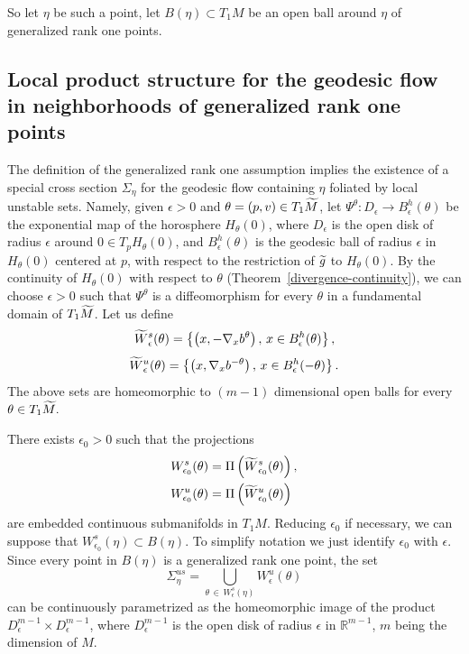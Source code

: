 \documentclass[AHL,Unicode,longabstracts,published]{cedram}
\newcommand{\bbR}{\mathbb{R}}
\let\oldtilde\tilde
\renewcommand*{\tilde}[1]{\mathchoice{\widetilde{#1}}{\widetilde{#1}}{\oldtilde{#1}}{\oldtilde{#1}}}
\begin{document}
So let $\eta$ be such a point, let $B(\eta) \subset T_{1}M$ be an open ball around $\eta$ of generalized rank one points.

\subsection{Local product structure for the geodesic flow in neighborhoods of generalized rank one points}

The definition of the generalized rank one assumption implies the existence of a special cross section $\Sigma_{\eta}$ for the geodesic flow containing $\eta$ foliated by local unstable sets. Namely, given $\epsilon >0$ and $\theta =(p,v) \in T_{1}\tilde{M}$, let $\Psi^{\theta} : D_{\epsilon} \longrightarrow B_{\epsilon}^{h}(\theta)$ be the exponential map of the horosphere $H_{\theta}(0)$, where $D_{\epsilon}$ is the open disk of radius $\epsilon$ around $0 \in T_{p}H_{\theta}(0)$, and $B_{\epsilon}^{h}(\theta)$ is the geodesic ball of radius $\epsilon$ in $H_{\theta}(0)$ centered at $p$, with respect to the restriction of $\tilde{g}$ to $H_{\theta}(0)$. By the continuity of $H_{\theta}(0)$ with respect to $\theta$ (Theorem~\ref{divergence-continuity}), we can choose $\epsilon >0$ such that $\Psi^{\theta}$ is a diffeomorphism for every $\theta$ in a fundamental domain of $T_{1}\tilde{M}$. Let us define
\[
\tilde{W}^{s}_{\epsilon}(\theta) = \left\{\left(x,-\nabla_{x}b^{\theta}\right),\, x \in B_{\epsilon}^{h}(\theta)\right\},
\]
\[
\tilde{W}^{u}_{\epsilon}(\theta) = \left\{\left(x, \nabla_{x}b^{-\theta}\right),\,x \in B_{\epsilon}^{h}(-\theta)\right\}.
\]
The above sets are homeomorphic to $(m-1)$ dimensional open balls for every $\theta \in T_{1}\tilde{M}.$

There exists $\epsilon_{0}>0$ such that the projections
\begin{align*}
W^{s}_{\epsilon_{0}}(\theta) &= \Pi\left(\tilde{W}^{s}_{\epsilon_{0}}(\theta)\right),
\\
W^{u}_{\epsilon_{0}}(\theta) &= \Pi\left(\tilde{W}^{u}_{\epsilon_{0}}(\theta)\right)
\end{align*}
are embedded continuous submanifolds in $T_{1}M$. Reducing $\epsilon_{0}$ if necessary, we can suppose that $W^{s}_{\epsilon_{0}}(\eta) \subset B(\eta)$. To simplify notation we just identify $\epsilon_{0}$ with $\epsilon$. Since every point in $B(\eta)$ is a generalized rank one point, the set
\[
\Sigma_{\eta}^{us} = \bigcup_{\theta\,\in\,W^{s}_{\epsilon}(\eta)} W^{u}_{\epsilon}(\theta)
\]
can be continuously parametrized as the homeomorphic image of the product $D^{m-1}_{\epsilon} \times D^{m-1}_{\epsilon}$, where $D^{m-1}_{\epsilon}$ is the open disk of radius $\epsilon$ in $\bbR^{m-1}$, $m$ being the dimension of $M$.
\end{document}
